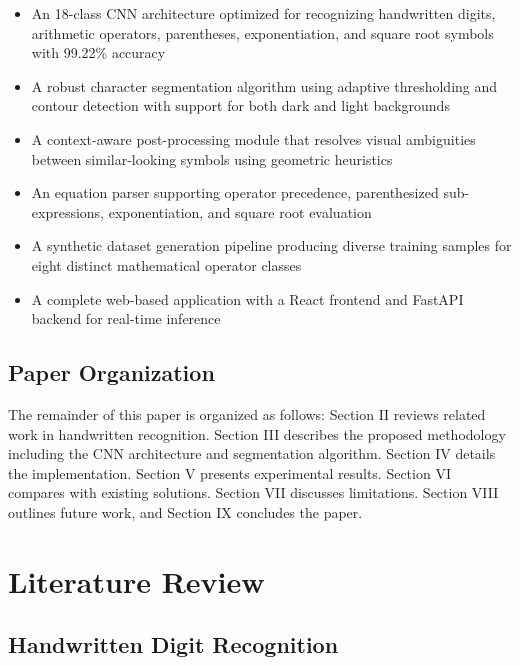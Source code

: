 \documentclass[conference]{IEEEtran}
\begin{document}
\begin{itemize}
    \item An 18-class CNN architecture optimized for recognizing handwritten digits, arithmetic operators, parentheses, exponentiation, and square root symbols with 99.22\% accuracy
    \item A robust character segmentation algorithm using adaptive thresholding and contour detection with support for both dark and light backgrounds
    \item A context-aware post-processing module that resolves visual ambiguities between similar-looking symbols using geometric heuristics
    \item An equation parser supporting operator precedence, parenthesized sub-expressions, exponentiation, and square root evaluation
    \item A synthetic dataset generation pipeline producing diverse training samples for eight distinct mathematical operator classes
    \item A complete web-based application with a React frontend and FastAPI backend for real-time inference
\end{itemize}

\subsection{Paper Organization}

The remainder of this paper is organized as follows: Section II reviews related work in handwritten recognition. Section III describes the proposed methodology including the CNN architecture and segmentation algorithm. Section IV details the implementation. Section V presents experimental results. Section VI compares with existing solutions. Section VII discusses limitations. Section VIII outlines future work, and Section IX concludes the paper.

\section{Literature Review}

\subsection{Handwritten Digit Recognition}
\end{document}

